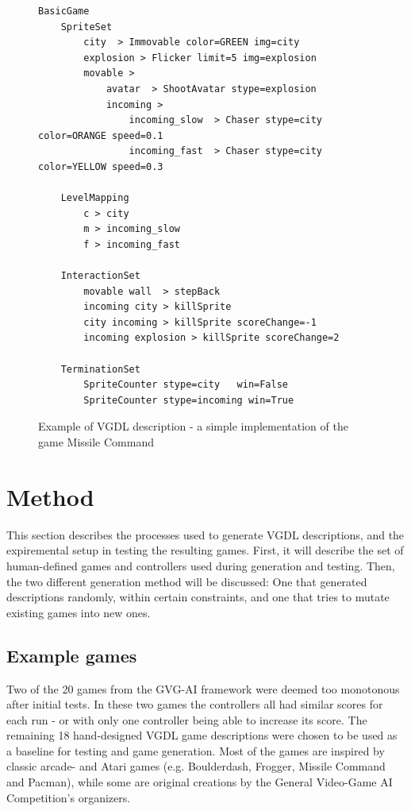 \documentclass{llncs}
\begin{document}
\begin{figure}[!ht]
\centering
\begin{lstlisting}
BasicGame
	SpriteSet
		city  > Immovable color=GREEN img=city
		explosion > Flicker limit=5 img=explosion
		movable >
			avatar  > ShootAvatar stype=explosion
			incoming >
				incoming_slow  > Chaser stype=city color=ORANGE speed=0.1
				incoming_fast  > Chaser stype=city color=YELLOW speed=0.3

	LevelMapping
		c > city
		m > incoming_slow
		f > incoming_fast
		
	InteractionSet
		movable wall  > stepBack
		incoming city > killSprite
		city incoming > killSprite scoreChange=-1
		incoming explosion > killSprite scoreChange=2

	TerminationSet
		SpriteCounter stype=city   win=False
		SpriteCounter stype=incoming win=True
\end{lstlisting}
\caption{Example of VGDL description - a simple implementation of the game Missile Command}
\label{fig:vgdl}
\end{figure}



\section{Method}
This section describes the processes used to generate VGDL descriptions, and the expiremental setup in testing the resulting games. First, it will describe the set of human-defined games and controllers used during generation and testing. Then, the two different generation method will be discussed: One that generated descriptions randomly, within certain constraints, and one that tries to mutate existing games into new ones.

\subsection{Example games}
\label{method:examples}
Two of the 20 games from the GVG-AI framework were deemed too monotonous after initial tests. 
In these two games the controllers all had similar scores for each run - or with only one controller being able to increase its score.
The remaining 18 hand-designed VGDL game descriptions were chosen to be used as a baseline for testing and game generation. 
Most of the games are inspired by classic arcade- and Atari games (e.g. Boulderdash, Frogger, Missile Command and Pacman), while some are original creations by the General Video-Game AI Competition's organizers. 
\end{document}

